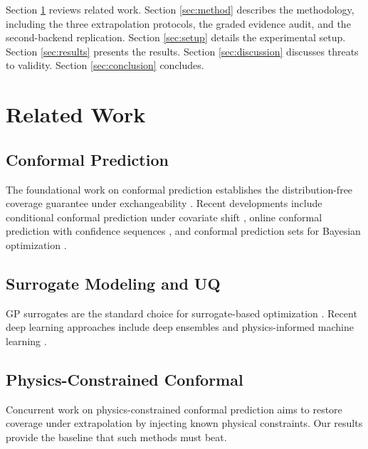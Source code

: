 \documentclass[journal]{IEEEtran}
\begin{document}
Section \ref{sec:related} reviews related work. Section \ref{sec:method}
describes the methodology, including the three extrapolation protocols, the
graded evidence audit, and the second-backend replication. Section
\ref{sec:setup} details the experimental setup. Section \ref{sec:results}
presents the results. Section \ref{sec:discussion} discusses threats to
validity. Section \ref{sec:conclusion} concludes.

\section{Related Work}
\label{sec:related}

\subsection{Conformal Prediction}

The foundational work on conformal prediction establishes the distribution-free
coverage guarantee under exchangeability \cite{vovk2005tutorial}. Recent
developments include conditional conformal prediction under covariate shift
\cite{barber2024covariateshift, kapoor2022covariate}, online conformal
prediction with confidence sequences \cite{angelopoulos2022confidence,
kapoor2023conformal_ts}, and conformal prediction sets for Bayesian
optimization \cite{stanton2023conformalbo}.

\subsection{Surrogate Modeling and UQ}

GP surrogates \cite{rasmussen2006gplm} are the standard choice for
surrogate-based optimization \cite{forrester2008surrogate, jones1998gpego}.
Recent deep learning approaches include deep ensembles \cite{gal2017ensembles}
and physics-informed machine learning \cite{karniadakis2021physics}.

\subsection{Physics-Constrained Conformal}

Concurrent work on physics-constrained conformal prediction \cite{physconf2026}
aims to restore coverage under extrapolation by injecting known physical
constraints. Our results provide the baseline that such methods must beat.
\end{document}
